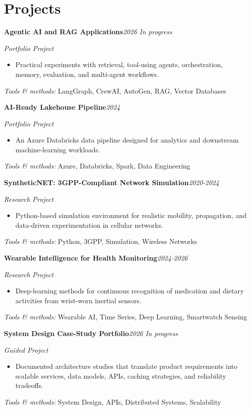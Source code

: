 \documentclass[9pt,letterpaper]{extarticle}
\newcommand{\entry}[2]{\Needspace{4\baselineskip}\textbf{#1}\hfill\textit{#2}\par}
\begin{document}
\section{Projects}
\entry{Agentic AI and RAG Applications}{2026 \textbar{} In progress}
\textit{Portfolio Project}\par
\begin{itemize}
\item Practical experiments with retrieval, tool-using agents, orchestration, memory, evaluation, and multi-agent workflows.
\end{itemize}
{\small\textit{Tools \& methods:} LangGraph, CrewAI, AutoGen, RAG, Vector Databases\par}
\entry{AI-Ready Lakehouse Pipeline}{2024}
\textit{Portfolio Project}\par
\begin{itemize}
\item An Azure Databricks data pipeline designed for analytics and downstream machine-learning workloads.
\end{itemize}
{\small\textit{Tools \& methods:} Azure, Databricks, Spark, Data Engineering\par}
\entry{SyntheticNET: 3GPP-Compliant Network Simulation}{2020-2024}
\textit{Research Project}\par
\begin{itemize}
\item Python-based simulation environment for realistic mobility, propagation, and data-driven experimentation in cellular networks.
\end{itemize}
{\small\textit{Tools \& methods:} Python, 3GPP, Simulation, Wireless Networks\par}
\entry{Wearable Intelligence for Health Monitoring}{2024-2026}
\textit{Research Project}\par
\begin{itemize}
\item Deep-learning methods for continuous recognition of medication and dietary activities from wrist-worn inertial sensors.
\end{itemize}
{\small\textit{Tools \& methods:} Wearable AI, Time Series, Deep Learning, Smartwatch Sensing\par}
\entry{System Design Case-Study Portfolio}{2026 \textbar{} In progress}
\textit{Guided Project}\par
\begin{itemize}
\item Documented architecture studies that translate product requirements into scalable services, data models, APIs, caching strategies, and reliability tradeoffs.
\end{itemize}
{\small\textit{Tools \& methods:} System Design, APIs, Distributed Systems, Scalability\par}
\end{document}
